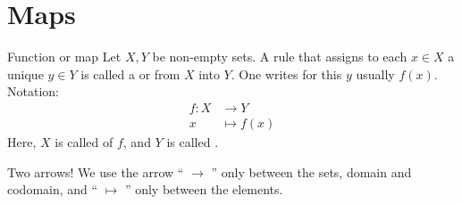 \section{Maps} \label{sec:map}

\begin{Definition}{Function or map} \label{Def:Funktion}
Let $X,Y$ be non-empty sets. A rule 
that assigns to 
each  $x\in X$ a unique  $y\in Y$
is called a  or 
from $X$ into $Y$. One writes for this $y$ usually $f(x)$.\\[0.5em]
Notation:\\[-2em]
\begin{align*}
f:X &\rightarrow Y \\
x &\mapsto f(x)
\end{align*}
Here, $X$ is called  of $f$, and $Y$ is called . 
\end{Definition} 


\white{2cm}{}


\begin{Attention}{Two arrows!}
We use the arrow `` $\to$ '' only between the sets, domain and codomain,
and `` $\mapsto$ '' only between the elements.
\end{Attention}

\white{1cm}{}


